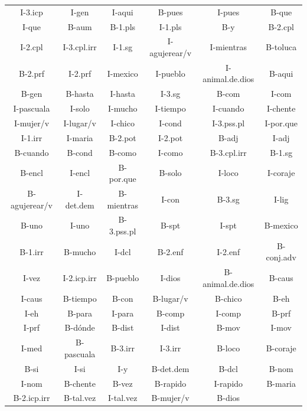\documentclass[letterpaper,12pt,oneside]{book}
\begin{document}
\begin{center}
\begin{longtable}{| c | c | c | c | c | c |}
		I-3.icp & I-gen & I-aqui & B-pues & I-pues & B-que \\

		I-que & B-aum & B-1.pls & I-1.pls & B-y & B-2.cpl \\

		I-2.cpl & I-3.cpl.irr & I-1.sg & I-agujerear/v & I-mientras & B-toluca \\

		B-2.prf & I-2.prf & I-mexico & I-pueblo & I-animal.de.dios & B-aqui \\

		B-gen & B-hasta & I-hasta & I-3.sg & B-com & I-com \\

		I-pascuala & I-solo & I-mucho & I-tiempo & I-cuando & I-chente \\

		I-mujer/v & I-lugar/v & I-chico & I-cond & I-3.pss.pl & I-por.que \\

		I-1.irr & I-maria & B-2.pot & I-2.pot & B-adj & I-adj \\

		B-cuando & B-cond & B-como & I-como & B-3.cpl.irr & B-1.sg \\

		B-encl & I-encl & B-por.que & B-solo & I-loco & I-coraje \\

		B-agujerear/v & I-det.dem & B-mientras & I-con & B-3.sg & I-lig \\

		B-uno & I-uno & B-3.pss.pl & B-spt & I-spt & B-mexico \\

		B-1.irr & B-mucho & I-dcl & B-2.enf & I-2.enf & B-conj.adv \\

		I-vez & I-2.icp.irr & B-pueblo & I-dios & B-animal.de.dios & B-caus \\

		I-caus & B-tiempo & B-con & B-lugar/v & B-chico & B-eh \\

		I-eh & B-para & I-para & B-comp & I-comp & B-prf \\

		I-prf & B-dónde & B-dist & I-dist & B-mov & I-mov \\

		I-med & B-pascuala & B-3.irr & I-3.irr & B-loco & B-coraje \\

		B-si & I-si & I-y & B-det.dem & B-dcl & B-nom \\

		I-nom & B-chente & B-vez & B-rapido & I-rapido & B-maria \\

		B-2.icp.irr & B-tal.vez & I-tal.vez & B-mujer/v & B-dios & 
\\
		\hline
	\end{longtable}
\end{center}
\end{document}
